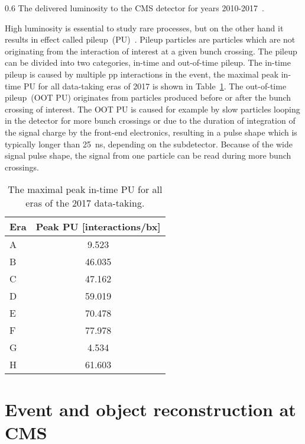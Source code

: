                  {0.6}       %
                 { The delivered luminosity to the CMS detector for years 2010-2017~\cite{website:CMSlumi}. }


High luminosity is essential to study rare processes, but on the other hand it results in effect called pileup~(PU)~\cite{Bayatian:2006nff}. Pileup particles are particles which are not originating from the interaction of interest at a given bunch crossing. The pileup can be divided into two categories, in-time and out-of-time pileup. The in-time pileup is caused by multiple pp interactions in the event, the maximal peak in-time PU for all data-taking eras of 2017 is shown in Table~\ref{tab:PU}.  The out-of-time pileup~(OOT PU) originates from particles produced before or after the bunch crossing of interest. The OOT PU is caused for example by slow particles looping in the detector for more bunch crossings or due to the duration of integration of the signal charge by the front-end electronics, resulting in a pulse shape which is typically longer than 25~ns, depending on the subdetector. Because of the wide signal pulse shape, the signal from one particle can be read during more bunch crossings.

\begin{table}[h]
\begin{center}
\begin{tabular}{|l|c|}
\hline
Era & Peak PU [interactions/bx]  \\
\hline
A & 9.523  \\
B & 46.035  \\
C & 47.162  \\
D & 59.019  \\
E & 70.478  \\
F & 77.978  \\
G & 4.534  \\
H & 61.603  \\
\hline
\end{tabular}
\caption[Table caption text]{The maximal peak in-time PU for all eras of the 2017 data-taking. }
\label{tab:PU}
\end{center}
\end{table}
\newpage

\section{Event and object reconstruction at CMS~\label{sec:objects}}

